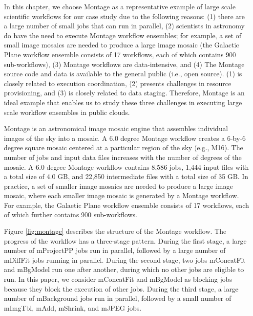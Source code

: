 In this chapter, we choose Montage as a representative example of large scale scientific workflows for our case study due to the following reasons:  (1) there are a large number of small jobs that can run in parallel, (2) scientists in astronomy do have the need to execute Montage workflow ensembles; for example, a set of small image mosaics are needed to produce a large image mosaic (the Galactic Plane workflow ensemble \cite{deelman2013hosted} consists of 17 workflows, each of which contains 900 sub-workflows), (3) Montage workflows are data-intensive, and (4) The Montage source code and data is available to the general public (i.e., open source). (1) is closely related to execution coordination, (2) presents challenges in resource provisioning, and (3) is closely related to data staging. Therefore, Montage is an ideal example that enables us to study these three challenges in executing large scale workflow ensembles in public clouds.

Montage is an astronomical image mosaic engine that assembles individual images of the sky into a mosaic. A 6.0 degree Montage workflow creates a 6-by-6 degree square mosaic centered at a particular region of the sky (e.g., M16). The number of jobs and input data files increases with the number of degrees of the mosaic. A 6.0 degree Montage workflow contains 8,586 jobs, 1,444 input files with a total size of 4.0 GB, and 22,850 intermediate files with a total size of 35 GB. In practice, a set of smaller image mosaics are needed to produce a large image mosaic, where each smaller image mosaic is generated by a Montage workflow. For example, the Galaetic Plane workflow ensemble \cite{deelman2013hosted} consists of 17 workflows, each of which further contains 900 sub-workflows. 


Figure \ref{fig:montage} describes the structure of the Montage workflow. The progress of the workflow has a three-stage pattern. During the first stage, a large number of mProjectPP jobs run in parallel, followed by a large number of mDiffFit jobs running in parallel. During the second stage, two jobs mConcatFit and mBgModel run one after another, during which no other jobs are eligible to run. In this paper, we consider mConcatFit and mBgModel as blocking jobs because they block the execution of other jobs. During the third stage, a large number of mBackground jobs run in parallel, followed by a small number of mImgTbl, mAdd, mShrink, and mJPEG jobs.

